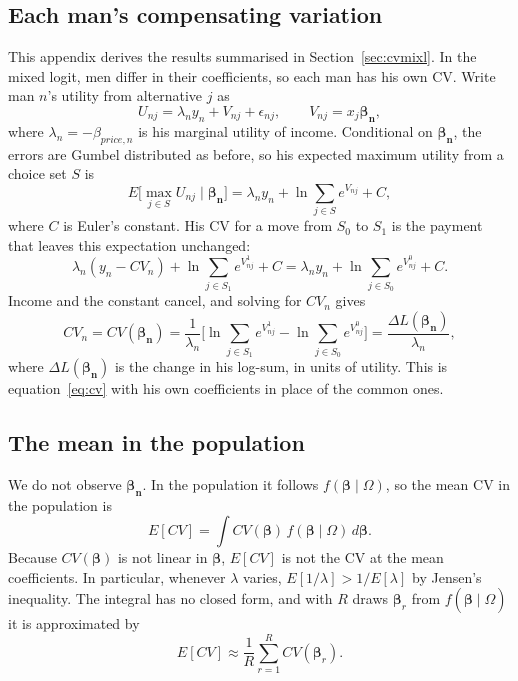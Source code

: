 \documentclass[11pt]{article}
\numberwithin{equation}{section}\numberwithin{figure}{section}\numberwithin{table}{section}
\begin{document}
\subsection{Each man's compensating variation}
This appendix derives the results summarised in Section~\ref{sec:cvmixl}. In the mixed logit, men differ in their coefficients, so each man has his own CV. Write man $n$'s utility from alternative $j$ as
\begin{equation}\label{eq:un}
U_{nj} = \lambda_n y_n + V_{nj} + \epsilon_{nj}, \qquad V_{nj} = x_j\boldsymbol{\beta_n},
\end{equation}
where $\lambda_n = -\beta_{price,n}$ is his marginal utility of income. Conditional on $\boldsymbol{\beta_n}$, the errors are Gumbel distributed as before, so his expected maximum utility from a choice set $S$ is
\begin{equation}\label{eq:emax}
E\Big[\max_{j \in S} U_{nj} \;\Big|\; \boldsymbol{\beta_n}\Big] = \lambda_n y_n + \ln \sum_{j \in S} e^{V_{nj}} + C,
\end{equation}
where $C$ is Euler's constant. His CV for a move from $S_0$ to $S_1$ is the payment that leaves this expectation unchanged:
\begin{equation}\label{eq:cvn0}
\lambda_n (y_n - CV_n) + \ln \sum_{j \in S_1} e^{V_{nj}^1} + C = \lambda_n y_n + \ln \sum_{j \in S_0} e^{V_{nj}^0} + C.
\end{equation}
Income and the constant cancel, and solving for $CV_n$ gives
\begin{equation}\label{eq:cvn}
CV_n = CV(\boldsymbol{\beta_n}) = \frac{1}{\lambda_n}\Bigg[\ln \sum_{j \in S_1} e^{V_{nj}^1} - \ln \sum_{j \in S_0} e^{V_{nj}^0}\Bigg] = \frac{\Delta L(\boldsymbol{\beta_n})}{\lambda_n},
\end{equation}
where $\Delta L(\boldsymbol{\beta_n})$ is the change in his log-sum, in units of utility. This is equation~\ref{eq:cv} with his own coefficients in place of the common ones.

\subsection{The mean in the population}
We do not observe $\boldsymbol{\beta_n}$. In the population it follows $f(\boldsymbol{\beta} \mid \Omega)$, so the mean CV in the population is
\begin{equation}\label{eq:ecv}
E[CV] = \int CV(\boldsymbol{\beta})\, f(\boldsymbol{\beta} \mid \Omega)\, d\boldsymbol{\beta}.
\end{equation}
Because $CV(\boldsymbol{\beta})$ is not linear in $\boldsymbol{\beta}$, $E[CV]$ is not the CV at the mean coefficients. In particular, whenever $\lambda$ varies, $E[1/\lambda] > 1/E[\lambda]$ by Jensen's inequality. The integral has no closed form, and with $R$ draws $\boldsymbol{\beta}_r$ from $f(\boldsymbol{\beta} \mid \hat\Omega)$ it is approximated by
\begin{equation}\label{eq:ecvsim}
E[CV] \approx \frac{1}{R}\sum_{r=1}^{R} CV(\boldsymbol{\beta}_r).
\end{equation}
\end{document}
